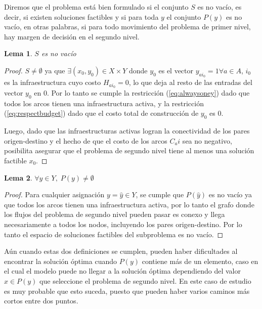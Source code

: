 \documentclass{article}
\newtheorem{lemma}{Lema}
\begin{document}
  Diremos que el problema está bien formulado si el conjunto $S$ es no vacío, es decir, si existen soluciones factibles y si para toda $y$ el conjunto $P(y)$ es no vacío, en otras palabras, si para todo movimiento del problema de primer nivel, hay margen de decisión en el segundo nivel.

  \begin{lemma}$S$ es no vacío
  \end{lemma}

  \begin{proof}
    $S \neq \emptyset$ ya que $\exists (x_0, y_0) \in X \times Y$ donde $y_0$ es el vector $y_{ai_0} = 1 \forall a \in A$, $i_0$ es la infraestructura cuyo costo $H_{ai_0} = 0$, lo que deja al resto de las entradas del vector $y_0$ en $0$. Por lo tanto se cumple la restricción (\ref{eq:alwaysoney}) dado que todos los arcos tienen una infraestructura activa, y la restricción (\ref{eq:respectbudget}) dado que el costo total de construcción de $y_0$ es $0$.

    Luego, dado que las infraestructuras activas logran la conectividad de los pares origen-destino y el hecho de que el costo de los arcos $C_ai$ sea no negativo, posibilita asegurar que el problema de segundo nivel tiene al menos una solución factible $x_0$.
  \end{proof}

  \begin{lemma}$\forall y \in Y,\; P(y) \neq \emptyset$
  \end{lemma}

  \begin{proof}
    Para cualquier asignación $y = \hat{y} \in Y$, se cumple que $P(\hat{y})$ es no vacío ya que todos los arcos tienen una infraestructura activa, por lo tanto el grafo donde los flujos del problema de segundo nivel pueden pasar es conexo y llega necesariamente a todos los nodos, incluyendo los pares origen-destino. Por lo tanto el espacio de soluciones factibles del subproblema es no vacío. 
  \end{proof}

  Aún cuando estas dos definiciones se cumplen, pueden haber dificultades al encontrar la solución óptima cuando $P(y)$ contiene más de un elemento, caso en el cual el modelo puede no llegar a la solución óptima dependiendo del valor $x \in P(y)$ que seleccione el problema de segundo nivel. En este caso de estudio es muy probable que esto suceda, puesto que pueden haber varios caminos más cortos entre dos puntos.
\end{document}
